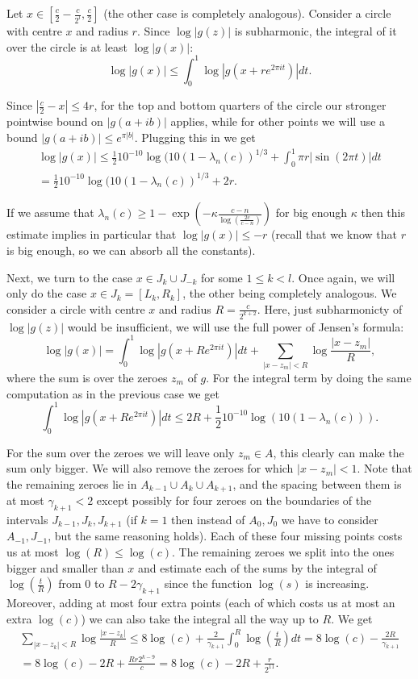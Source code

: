 \documentclass[12pt]{amsart}
\numberwithin{equation}{section}
\begin{document}
Let $x\in  [\frac{c}{2}-\frac{c}{2^{l}}, \frac{c}{2}]$ (the other case is completely analogous). Consider a circle with centre $x$ and radius $r$. Since $\log |g(z)|$ is subharmonic, the integral of it over the circle is at least $\log |g(x)|$:
$$\log |g(x)| \le \int_0^1 \log |g(x + re^{2\pi i t})|dt.$$

Since $|\frac{c}{2}-x| \le 4r$, for the top and bottom quarters of the circle our stronger pointwise bound on $|g(a+ib)|$ applies, while for other points we will use a bound $|g(a+ib)| \le e^{\pi |b|}$. Plugging this in we get
\begin{align*}\log |g(x)| \le \frac{1}{2} 10^{-10} \log(10(1-\lambda_n(c))^{1/3} + \int_0^1 \pi r |\sin(2\pi t)| dt\\ =\frac{1}{2}10^{-10}\log(10(1-\lambda_n(c))^{1/3} +2r.
\end{align*}

If we assume that $\lambda_n(c) \ge 1 - \exp\left(-\kappa\frac{c-n}{\log(\frac{2c}{c-n})}\right)$ for big enough $\kappa$ then this estimate implies in particular that $\log |g(x)| \le -r$ (recall that we know that $r$ is big enough, so we can absorb all the constants).

Next, we turn to the case $x\in J_k\cup J_{-k}$ for some $1 \le k < l$. Once again, we will only do the case $x\in J_k = [L_k, R_k]$, the other being completely analogous. We consider a circle with centre $x$ and radius $R=\frac{c}{2^{k+2}}$. Here, just subharmonicty of $\log |g(z)|$ would be insufficient, we will use the full power of Jensen's formula:
$$\log |g(x)| = \int_0^1 \log |g(x+Re^{2\pi i t})|dt + \sum_{|x-z_m| < R} \log \frac{|x-z_m|}{R},$$
where the sum is over the zeroes $z_m$ of $g$.	For the integral term by doing the same computation as in the previous case we get
$$\int_0^1 \log |g(x+Re^{2\pi i t})|dt \le 2R + \frac{1}{2}10^{-10}\log(10(1-\lambda_n(c))).$$

For the sum over the zeroes we will leave only $z_m\in A$, this clearly can make the sum only bigger. We will also remove the zeroes for which $|x-z_m| < 1$. Note that the remaining zeroes lie in $A_{k-1}\cup A_k\cup A_{k+1}$, and the spacing between them is at most $\gamma_{k+1} < 2$ except possibly for four zeroes on the boundaries of the intervals $J_{k-1}, J_k, J_{k+1}$ (if $k = 1$ then instead of $A_0, J_0$ we have to consider $A_{-1}, J_{-1}$, but the same reasoning holds). Each of these four missing points costs us at most $\log(R)\le \log(c)$. The remaining zeroes we split into the ones bigger and smaller than $x$ and estimate each of the sums by the integral of $\log(\frac{t}{R})$ from $0$ to $R-2\gamma_{k+1}$ since the function $\log(s)$ is increasing. Moreover, adding at most four extra points (each of which costs us at most an extra $\log(c)$) we can also take the integral all the way up to $R$. We get
\begin{align*}\sum_{|x-z_k| < R} \log \frac{|x-z_k|}{R} \le 8\log(c)+\frac{2}{\gamma_{k+1}}\int_0^{R}\log\left(\frac{t}{R}\right)dt=8\log(c)-\frac{2R}{\gamma_{k+1}}\\=8\log(c)-2R+\frac{Rr2^{k-9}}{c}=8\log(c)-2R+\frac{r}{2^{11}}.
\end{align*}
\end{document}

